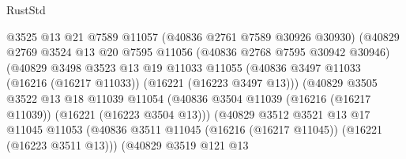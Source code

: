 \begin{lexlean}{RustStd}
\begin{coremodule}
                                  @3525
                                  @13
                                  @21
                                  @7589
                                  @11057
                                  (@40836 @2761 @7589 @30926 @30930)
                                  (@40829
                                    @2769
                                    @3524
                                    @13
                                    @20
                                    @7595
                                    @11056
                                    (@40836 @2768 @7595 @30942 @30946)
                                    (@40829
                                      @3498
                                      @3523
                                      @13
                                      @19
                                      @11033
                                      @11055
                                      (@40836
                                        @3497
                                        @11033
                                        (@16216 (@16217 @11033))
                                        (@16221 (@16223 @3497 @13)))
                                      (@40829
                                        @3505
                                        @3522
                                        @13
                                        @18
                                        @11039
                                        @11054
                                        (@40836
                                          @3504
                                          @11039
                                          (@16216 (@16217 @11039))
                                          (@16221 (@16223 @3504 @13)))
                                        (@40829
                                          @3512
                                          @3521
                                          @13
                                          @17
                                          @11045
                                          @11053
                                          (@40836
                                            @3511
                                            @11045
                                            (@16216 (@16217 @11045))
                                            (@16221 (@16223 @3511 @13)))
                                          (@40829
                                            @3519
                                            @121
                                            @13

\end{coremodule}
\end{lexlean}
